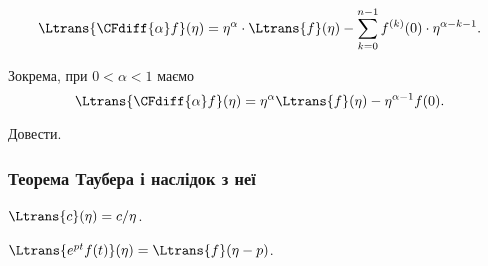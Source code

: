 \begin{lemma}
    \begin{equation}
        \Ltrans{\CFdiff{\alpha} f}(\eta) = \eta^{\alpha} \cdot \Ltrans{f}(\eta) - \sum_{k = 0}^{n - 1} f^{(k)}(0) \cdot \eta^{\alpha - k - 1}.
    \end{equation}
\end{lemma}

\begin{example}
    Зокрема, при $0 < \alpha < 1$ маємо
    \begin{equation}
        \Ltrans{\CFdiff{\alpha} f}(\eta) = \eta^{\alpha} \Ltrans{f}(\eta) - \eta^{\alpha - 1} f(0).
    \end{equation}
\end{example}

\begin{exercise}
    Довести.
\end{exercise}


\subsubsection{Теорема Таубера і наслідок з неї}

\begin{lemma}
    $\Ltrans{c}(\eta) = c / \eta$.
\end{lemma}

\begin{lemma}
    $\Ltrans{e^{p t} f(t)}(\eta) = \Ltrans{f}(\eta - p)$.
\end{lemma}

